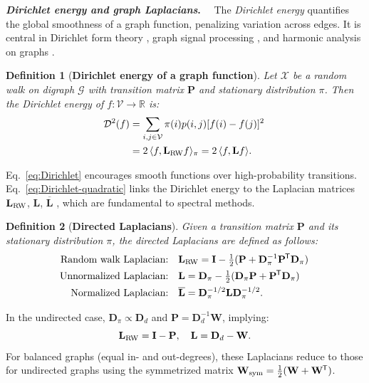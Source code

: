 \documentclass[10pt]{article} %
\def\eqref#1{equation~\ref{#1}}
\def\rmD{{\mathbf{D}}}
\def\rmL{{\mathbf{L}}}
\def\rmP{{\mathbf{P}}}
\def\rmW{{\mathbf{W}}}
\def\gV{{\mathcal{V}}}
\newtheorem{definition}{Definition}[section]
\newcommand{\D}[2]{\mathcal{D}^2_{#1}(#2)}
\renewcommand*{\top}{{\mkern-1.4mu\mathsf{T}}}
\renewcommand{\eqref}[1]{\ref{#1}}
\newcommand{\inlinetitle}[2]{\noindent\textbf{\textit{#1}{#2}}~~}
\begin{document}
\inlinetitle{Dirichlet energy and graph Laplacians}{.}%
The \textit{Dirichlet energy} quantifies the global smoothness of a graph function, penalizing variation across edges. It is central in Dirichlet form theory \citep{saloff1997lectures, montenegro2006mathematical}, graph signal processing \citep{GSP2012}, and harmonic analysis on graphs \citep{sevi2023harmonic}.
%
\begin{definition}[\textbf{Dirichlet energy of a graph function}]
Let $\mathcal{X}$ be a random walk on digraph $\mathcal{G}$ with transition matrix $\rmP$ and stationary distribution $\pi$. Then the Dirichlet energy of $f : \gV \to \mathbb{R}$ is:
\begin{align}
  \D{}{f} &= \sum_{i,j \in \gV} \pi(i) p(i,j) [f(i) - f(j)]^2 \, \label{eq:Dirichlet} \\
           &= 2\, \langle f, \rmL_{\textnormal{RW}} f \rangle_{\pi} = 2\, \langle f, \rmL f \rangle. \label{eq:Dirichlet-quadratic}
\end{align}
\end{definition}
%
Eq.~\eqref{eq:Dirichlet} encourages smooth functions over high-probability transitions. Eq.~\eqref{eq:Dirichlet-quadratic} links the Dirichlet energy to the Laplacian matrices $\rmL_{\textnormal{RW}}$, $\rmL$, $\overline{\rmL}$ \citep{chung2005laplacians,sevi2023harmonic}, which are fundamental to spectral methods.
%
\begin{definition}[\textbf{Directed Laplacians}]
Given a transition matrix $\rmP$ and its stationary distribution $\pi$, the directed Laplacians are defined as follows:
\begin{align}
  \text{Random walk Laplacian:} & \quad \rmL_{\textnormal{RW}} = \mathbf{I} - \tfrac{1}{2}(\rmP + \rmD_{\pi}^{-1} \rmP^\top \rmD_{\pi}) \, \label{eq:rw_lap_d} \\
  \text{Unnormalized Laplacian:} & \quad \rmL = \rmD_{\pi} - \tfrac{1}{2}(\rmD_{\pi} \rmP + \rmP^\top \rmD_{\pi}) \, \label{eq:unnorm_lap_d} \\
  \text{Normalized Laplacian:} & \quad \overline{\rmL} = \rmD_{\pi}^{-1/2} \rmL \rmD_{\pi}^{-1/2}.
\end{align}
\end{definition}
%
In the undirected case, $\rmD_{\pi} \propto \rmD_d$ and $\rmP = \rmD_d^{-1} \rmW$, implying:
\begin{equation}
  \rmL_{\textnormal{RW}} = \mathbf{I} - \rmP, \quad \rmL = \rmD_d - \rmW.
\end{equation}
For balanced graphs (equal in- and out-degrees), these Laplacians reduce to those for undirected graphs using the symmetrized matrix $\rmW_{\text{sym}} = \tfrac{1}{2}(\rmW + \rmW^\top)$.
\end{document}
